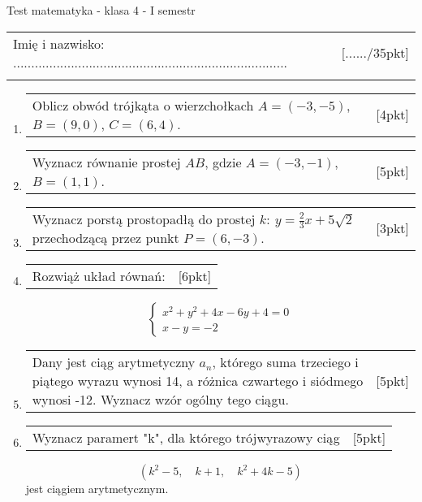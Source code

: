 \documentclass[12pt,a4paper]{article}
\begin{document}
	\begin{center}
		\LARGE Test matematyka - klasa 4 - I semestr
	\end{center}
	\vspace{1.5cm}
	\begin{tabular}{p{13cm} r}
		Imię i nazwisko: ............................................................................
		&[....../35pkt]\\ 
		\vspace{0.5cm}
	\end{tabular}
	\begin{enumerate}[1.]
		\item  \begin{tabular}{p{13cm} r}
			Oblicz obwód trójkąta o wierzchołkach $A=(-3,-5)$,$B=(9,0)$, $C=(6,4)$.
			&[4pkt]\\ 
		\end{tabular}
	
	\item \begin{tabular}{p{13cm} r}
		Wyznacz równanie prostej $AB$, gdzie $A=(-3,-1)$, $B=(1,1)$.
		&[5pkt]\\
	\end{tabular}

	\item \begin{tabular}{p{13cm} r}
		Wyznacz porstą prostopadłą do prostej $k:\:y=\frac{2}{3}x+5\sqrt{2}$ przechodzącą przez punkt $P=(6,-3)$.&[3pkt]\\
	\end{tabular}

	\item \begin{tabular}{p{13cm} r}
		Rozwiąż układ równań: &[6pkt]\\ 
	\end{tabular}
	$$\left\{\begin{array}{l}
		x^2+y^2+4x-6y+4=0\\
		x-y=-2
	\end{array}\right.$$

	\item  \begin{tabular}{p{13cm} r}
		Dany jest ciąg arytmetyczny $a_n$, którego suma trzeciego i piątego wyrazu wynosi 14, a różnica czwartego i siódmego wynosi -12. Wyznacz wzór ogólny tego ciągu. 
		&[5pkt]\\ 
	\end{tabular}

	\item \begin{tabular}{p{13cm} r}
		Wyznacz paramert "k", dla którego trójwyrazowy ciąg
		&[5pkt]\\
	\end{tabular}
	$$(k^2-5,\quad k+1, \quad k^2+4k-5)$$
	jest ciągiem arytmetycznym. 
	

\end{enumerate}
\end{document}
